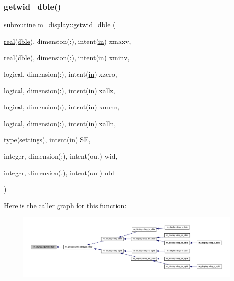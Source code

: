 \subsubsection{\texorpdfstring{getwid\+\_\+dble()}{getwid\_dble()}}
{\footnotesize\ttfamily \hyperlink{M__stopwatch_83_8txt_acfbcff50169d691ff02d4a123ed70482}{subroutine} m\+\_\+display\+::getwid\+\_\+dble (\begin{DoxyParamCaption}\item[{\hyperlink{read__watch_83_8txt_abdb62bde002f38ef75f810d3a905a823}{real}(\hyperlink{namespacem__display_a46d90b75b6ccef7ccade133e5847e815}{dble}), dimension(\+:), intent(\hyperlink{M__journal_83_8txt_afce72651d1eed785a2132bee863b2f38}{in})}]{xmaxv,  }\item[{\hyperlink{read__watch_83_8txt_abdb62bde002f38ef75f810d3a905a823}{real}(\hyperlink{namespacem__display_a46d90b75b6ccef7ccade133e5847e815}{dble}), dimension(\+:), intent(\hyperlink{M__journal_83_8txt_afce72651d1eed785a2132bee863b2f38}{in})}]{xminv,  }\item[{logical, dimension(\+:), intent(\hyperlink{M__journal_83_8txt_afce72651d1eed785a2132bee863b2f38}{in})}]{xzero,  }\item[{logical, dimension(\+:), intent(\hyperlink{M__journal_83_8txt_afce72651d1eed785a2132bee863b2f38}{in})}]{xallz,  }\item[{logical, dimension(\+:), intent(\hyperlink{M__journal_83_8txt_afce72651d1eed785a2132bee863b2f38}{in})}]{xnonn,  }\item[{logical, dimension(\+:), intent(\hyperlink{M__journal_83_8txt_afce72651d1eed785a2132bee863b2f38}{in})}]{xalln,  }\item[{\hyperlink{stop__watch_83_8txt_a70f0ead91c32e25323c03265aa302c1c}{type}(settings), intent(\hyperlink{M__journal_83_8txt_afce72651d1eed785a2132bee863b2f38}{in})}]{SE,  }\item[{integer, dimension(\+:), intent(out)}]{wid,  }\item[{integer, dimension(\+:), intent(out)}]{nbl }\end{DoxyParamCaption})\hspace{0.3cm}{\ttfamily [private]}}

Here is the caller graph for this function\+:
\nopagebreak
\begin{figure}[H]
\begin{center}
\leavevmode
\includegraphics[width=350pt]{namespacem__display_abfcfe1ce55c2ec6aa7a261f6039a19d4_icgraph}
\end{center}
\end{figure}
\mbox{\label{namespacem__display_a6d7287cccf11d65c1821020ef61c7992}} 
